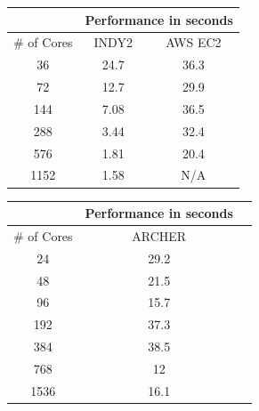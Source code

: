 \begin{center}

\label{table:perf}

\begin{tabular}{|c|c|c|}
\hline
\multicolumn{1}{|l|}{}            & \multicolumn{2}{c|}{Performance in seconds}               \\ \hline
\multicolumn{1}{|c|}{\# of Cores} & \multicolumn{1}{c|}{INDY2} & \multicolumn{1}{c|}{AWS EC2} \\ \hline
36                                & 24.7                       & 36.3                         \\ \hline
72                                & 12.7                       & 29.9                         \\ \hline
144                               & 7.08                       & 36.5                         \\ \hline
288                               & 3.44                       & 32.4                         \\ \hline
576                               & 1.81                       & 20.4                         \\ \hline
1152                              & 1.58                       & N/A                             \\ \hline
\end{tabular}

\end{center}



\vspace{1cm}

\begin{center}
\label{table:perf-archer}
\begin{tabular}{|c|c|c|}
\hline
\multicolumn{1}{|l|}{}            & \multicolumn{1}{c|}{Performance in seconds}               \\ \hline
\multicolumn{1}{|l|}{\# of Cores} & \multicolumn{1}{c|}{ARCHER}  \\ \hline
24                                & 29.2                                           \\ \hline
48                                & 21.5                                         \\ \hline
96                               & 15.7                                       \\ \hline
192                               & 37.3                                           \\ \hline
384                               & 38.5                                               \\ \hline
768                              & 12                                              \\ \hline
1536                              & 16.1                                              \\ \hline
\end{tabular}
\end{center}


